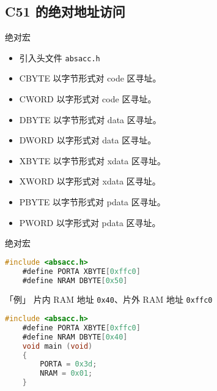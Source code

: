\documentclass{beamer}
\begin{document}
\subsection{C51 的绝对地址访问}

\begin{frame}[fragile]{绝对宏}
    \begin{itemize}

        \item
            引入头文件 \texttt{absacc.h}
        \item
            CBYTE 以字节形式对 code 区寻址。
        \item
            CWORD 以字形式对 code 区寻址。
            \pause
        \item
            DBYTE 以字节形式对 data 区寻址。
        \item
            DWORD 以字形式对 data 区寻址。
        \item
            XBYTE 以字节形式对 xdata 区寻址。
        \item
            XWORD 以字形式对 xdata 区寻址。
        \item
            PBYTE 以字节形式对 pdata 区寻址。
        \item
            PWORD 以字形式对 pdata 区寻址。
    \end{itemize}

\end{frame}

\begin{frame}[fragile]{绝对宏}
    \begin{lstlisting}[language=C]
    #include <absacc.h>
    #define PORTA XBYTE[0xffc0]
    #define NRAM DBYTE[0x50]
    \end{lstlisting}
\end{frame}

\begin{frame}[fragile]{「例」 片内 RAM 地址 \texttt{0x40}、片外 RAM 地址 \texttt{0xffc0}}
    \pause

    \begin{lstlisting}[language=C]
    #include <absacc.h>
    #define PORTA XBYTE[0xffc0]
    #define NRAM DBYTE[0x40]
    void main (void) 
    {
        PORTA = 0x3d;
        NRAM = 0x01;
    }
    \end{lstlisting}
\end{frame}
\end{document}
